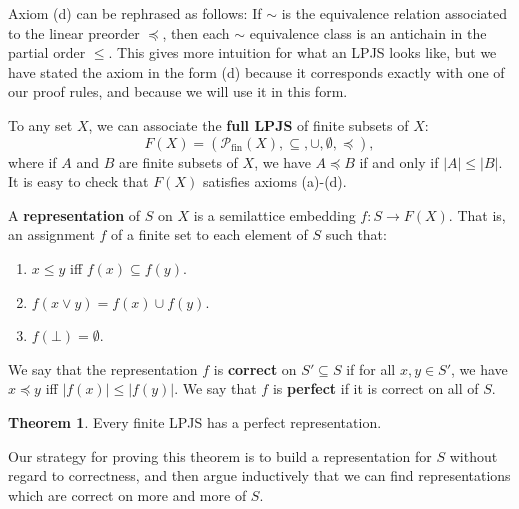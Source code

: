 \documentclass[12pt]{article}
\theoremstyle{definition}
\newtheorem{theorem}{Theorem}
\begin{document}
Axiom (d) can be rephrased as follows: If $\sim$ is the equivalence relation associated to the linear preorder $\preceq$, then each $\sim$ equivalence class is an antichain in the partial order $\leq$. This gives more intuition for what an LPJS looks like, but we have stated the axiom in the form (d) because it corresponds exactly with one of our proof rules, and because we will use it in this form. 

To any set $X$, we can associate the \textbf{full LPJS} of finite subsets of $X$: $$F(X) = (\mathcal{P}_\text{fin}(X), \subseteq, \cup, \emptyset, \preceq),$$ where if $A$ and $B$ are finite subsets of $X$, we have $A\preceq B$ if and only if $|A|\leq |B|$. It is easy to check that $F(X)$ satisfies axioms (a)-(d).

A \textbf{representation} of $S$ on $X$ is a semilattice embedding $f\colon S\to F(X)$. That is, an assignment $f$ of a finite set to each element of $S$ such that:
\begin{enumerate}[(1)]
    \item $x\leq y$ iff $f(x)\subseteq f(y)$.
    \item $f(x\vee y) = f(x)\cup f(y)$.
    \item $f(\bot) = \emptyset$.
\end{enumerate} 
We say that the representation $f$ is \textbf{correct} on $S'\subseteq S$ if for all $x,y\in S'$, we have $x\preceq y$ iff $|f(x)|\leq |f(y)|$. We say that $f$ is \textbf{perfect} if it is correct on all of $S$. 

\begin{theorem}\label{thm:rep}
Every finite LPJS has a perfect representation.
\end{theorem}

Our strategy for proving this theorem is to build a representation for $S$ without regard to correctness, and then argue inductively that we can find representations which are correct on more and more of $S$.
\end{document}
